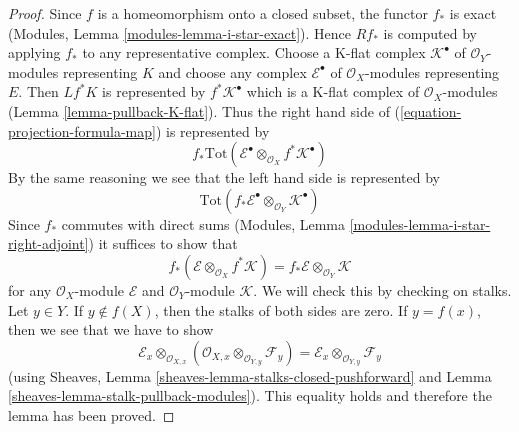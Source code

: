 \begin{proof}
Since $f$ is a homeomorphism onto a closed subset, the functor $f_*$
is exact (Modules, Lemma \ref{modules-lemma-i-star-exact}). Hence
$Rf_*$ is computed by applying $f_*$ to any representative complex.
Choose a K-flat complex $\mathcal{K}^\bullet$ of $\mathcal{O}_Y$-modules
representing $K$ and choose any complex $\mathcal{E}^\bullet$
of $\mathcal{O}_X$-modules representing $E$. Then
$Lf^*K$ is represented by $f^*\mathcal{K}^\bullet$ which is
a K-flat complex of $\mathcal{O}_X$-modules
(Lemma \ref{lemma-pullback-K-flat}). Thus the right hand side of
(\ref{equation-projection-formula-map}) is represented by
$$
f_*\text{Tot}(\mathcal{E}^\bullet
\otimes_{\mathcal{O}_X} f^*\mathcal{K}^\bullet)
$$
By the same reasoning we see that the left hand side is represented by
$$
\text{Tot}(f_*\mathcal{E}^\bullet \otimes_{\mathcal{O}_Y} \mathcal{K}^\bullet)
$$
Since $f_*$ commutes with direct sums
(Modules, Lemma \ref{modules-lemma-i-star-right-adjoint})
it suffices to show that
$$
f_*(\mathcal{E} \otimes_{\mathcal{O}_X} f^*\mathcal{K}) =
f_*\mathcal{E} \otimes_{\mathcal{O}_Y} \mathcal{K}
$$
for any $\mathcal{O}_X$-module $\mathcal{E}$ and $\mathcal{O}_Y$-module
$\mathcal{K}$. We will check this by checking on stalks.
Let $y \in Y$. If $y \not \in f(X)$, then the stalks
of both sides are zero. If $y = f(x)$, then we see that we have to show
$$
\mathcal{E}_x \otimes_{\mathcal{O}_{X, x}}
(\mathcal{O}_{X, x} \otimes_{\mathcal{O}_{Y, y}} \mathcal{F}_y) =
\mathcal{E}_x \otimes_{\mathcal{O}_{Y, y}} \mathcal{F}_y
$$
(using Sheaves, Lemma \ref{sheaves-lemma-stalks-closed-pushforward}
and Lemma \ref{sheaves-lemma-stalk-pullback-modules}).
This equality holds and therefore the lemma has been proved.
\end{proof}

